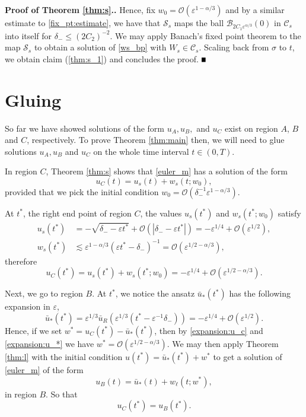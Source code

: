 \documentclass[letterpaper,11pt]{article}
\newcommand{\rmO}{\mathcal{O}}
\newcommand{\eps}{\varepsilon}
\newcommand{\lar}{ \lesssim }
\numberwithin{equation}{section}
\theoremstyle{plain}
\newenvironment{Proof}[1][\unskip]%
 {\begin{trivlist} \item[]{\bf Proof #1. }}%
 {\hspace*{\fill}$\rule{.4\baselineskip}{.4\baselineskip}$\end{trivlist}}
\begin{document}
\begin{Proof}[ of Theorem \ref{thm:s}.]
Hence, fix $w_0 = \rmO(\eps^{1-\alpha/3})$ and by a similar estimate to \eqref{fix_pt:estimate}, we have that $\mathcal{S}_s$ maps the ball $\mathcal{B}_{2C_1\eps^{\alpha/3}}(0)$ in $\mathcal{C}_s$ into itself for $\delta_-\le(2C_2)^{-2}$. We may apply Banach's fixed point theorem to the map $\mathcal{S}_s$ to obtain a solution of \eqref{ws_bp} with $W_s \in \mathcal{C}_s$. Scaling back from $\sigma$ to $t$, we obtain claim (\ref{thm:s_1}) and concludes the proof.
\end{Proof}

\section{Gluing}\label{sec_glue}
So far we have showed solutions of the form $u_A,u_B,$ and $u_C$ exist on region $A$, $B$ and $C$, respectively. To prove Theorem \ref{thm:main} then, we will need to glue solutions $u_A, u_B$ and $u_C$ on the whole time interval $t \in (0,T)$.

In region $C$, Theorem \ref{thm:s} shows that \eqref{euler_m} has
a solution of the form
\[
u_C(t) = u_s(t) + w_s(t;w_0),
\]
provided that we pick the initial condition $w_0= \rmO(\delta_-^{-1}\eps^{1-\alpha/3})$.

At $t^*$, the right end point of region $C$, the values $u_s(t^*)$ and $w_s(t^*; w_0)$ satisfy
\begin{align*}
u_s(t^*) &= -\sqrt{\delta_--\eps t^*}+\rmO(|\delta_--\eps t^*|) = -\eps^{1/4}+\rmO(\eps^{1/2}),\\
w_s(t^*) &\lar \eps^{1-\alpha/3}(\eps t^*-\delta_-)^{-1} =  \rmO(\eps^{1/2-\alpha/3}),
\end{align*}
therefore
\begin{equation}\label{expansion:u_c}
 u_C(t^*) = u_s(t^*) + w_s(t^*; w_0) = -\eps^{1/4} + \rmO(\eps^{1/2-\alpha/3}).
\end{equation}

Next, we go to region $B$. At $t^*$, we notice the ansatz $\bar{u}_*(t^*)$ has the following expansion in $\eps$,
\begin{equation}\label{expansion:u_*}
\bar{u}_*(t^*) = \eps^{1/3}\bar{u}_R(\eps^{1/3}(t^*-\eps^{-1}\delta_-)) = -\eps^{1/4}+ \rmO(\eps^{1/2}).
\end{equation}
Hence, if we set $w^* = u_C(t^*)-\bar{u}_*(t^*)$, then by \eqref{expansion:u_c} and \eqref{expansion:u_*} we have $w^* = \rmO(\eps^{1/2-\alpha/3})$. We may then apply Theorem \ref{thm:l} with the initial condition $u(t^*)=  \bar{u}_*(t^*) + w^*$ to get a solution of \eqref{euler_m} of the form
\[
u_B(t) = \bar{u}_*(t) + w_\ell(t; w^*),
\]
in region $B$. So that
\begin{equation} \label{match_bc}
u_C(t^*) = u_B(t^*).
\end{equation}
\end{document}
